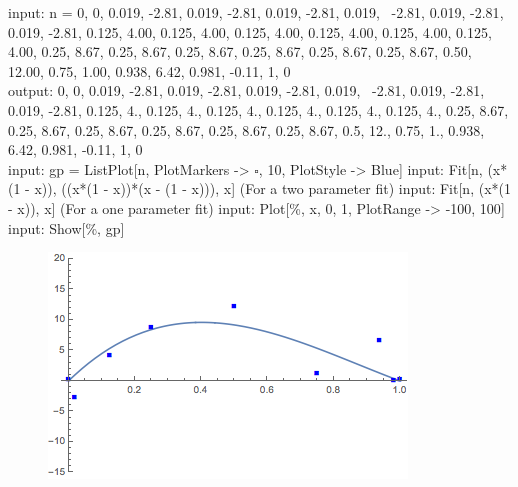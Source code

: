 input: n = {{0, 0}, {0.019, -2.81}, {0.019, -2.81}, {0.019, -2.81}, {0.019, \
		-2.81}, {0.019, -2.81}, {0.019, -2.81}, {0.125, 4.00}, {0.125, 
		4.00}, {0.125, 4.00}, {0.125, 4.00}, {0.125, 4.00}, {0.125, 
		4.00}, {0.25, 8.67}, {0.25, 8.67}, {0.25, 8.67}, {0.25, 
		8.67}, {0.25, 8.67}, {0.25, 8.67}, {0.50, 12.00}, {0.75, 
		1.00}, {0.938, 6.42}, {0.981, -0.11}, {1, 0}}
\\
\noindent output: {{0, 0}, {0.019, -2.81}, {0.019, -2.81}, {0.019, -2.81}, {0.019, \
		-2.81}, {0.019, -2.81}, {0.019, -2.81}, {0.125, 4.}, {0.125, 
		4.}, {0.125, 4.}, {0.125, 4.}, {0.125, 4.}, {0.125, 4.}, {0.25, 
		8.67}, {0.25, 8.67}, {0.25, 8.67}, {0.25, 8.67}, {0.25, 
		8.67}, {0.25, 8.67}, {0.5, 12.}, {0.75, 1.}, {0.938, 
		6.42}, {0.981, -0.11}, {1, 0}}
\\
\noindent input: gp = ListPlot[n, PlotMarkers -> {$\square$, 10}, PlotStyle -> {Blue}]
\noindent input: Fit[n, {(x*(1 - x)), ((x*(1 - x))*(x - (1 - x)))}, x] (For a two parameter fit)
\noindent input: Fit[n, {(x*(1 - x))}, x] (For a one parameter fit)
\noindent input: Plot[\%, {x, 0, 1}, PlotRange -> {-100, 100}]
\noindent input: Show[\%, gp]

\begin{figure}[H]
	\centering
	\includegraphics[width=\textwidth]{Appendix-C/Figures/fitting.png}
	\caption{}
	\label{appendixC:fitting}
\end{figure}